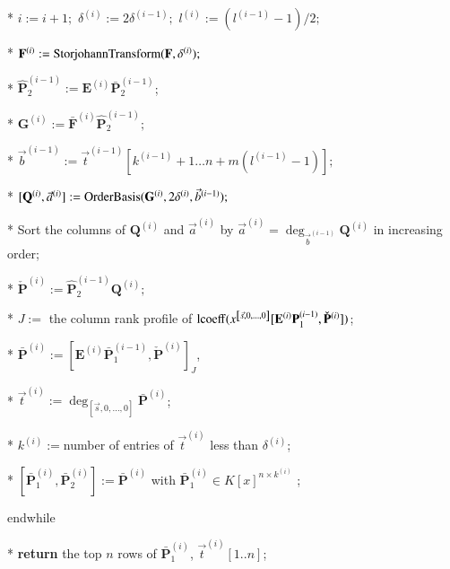 \begin{algorithm}[t]
\begin{algor}[1]
\item [{{{*}}}] $i:=i+1;$ $\delta^{\left(i\right)}:=2\delta^{\left(i-1\right)};$
$l^{\left(i\right)}:=(l^{\left(i-1\right)}-1)/2;$ 
\item [{{{*}}}] $\bar{\mathbf{F}}^{\left(i\right)}:=\StorjohannTransform(\mathbf{F},\delta^{\left(i\right)});$ 
\item [{{{*}}}] $\hat{\mathbf{P}}_{2}^{\left(i-1\right)}:=\mathbf{E}^{\left(i\right)}\bar{\mathbf{P}}_{2}^{\left(i-1\right)}$;
\item [{{{*}}}] \label{line:matrixProduct1}$\mathbf{G}^{\left(i\right)}:=\bar{\mathbf{F}}^{\left(i\right)}\hat{\mathbf{P}}_{2}^{\left(i-1\right)};$ 
\item [{{{*}}}] $\vec{b}^{\left(i-1\right)}:=\vec{t}^{\left(i-1\right)}[k^{\left(i-1\right)}+1\dots n+m(l^{\left(i-1\right)}-1)];$ 
\item [{{{*}}}] \label{line:orderBasisComputation}$[\mathbf{Q}^{\left(i\right)},\vec{a}^{\left(i\right)}]:=\mab(\mathbf{G}^{\left(i\right)},2\delta^{\left(i\right)},\vec{b}^{\left(i-1\right)});$ 
\item [{{{*}}}] Sort the columns of $\mathbf{Q}^{\left(i\right)}$ and
$\vec{a}^{\left(i\right)}$ by $\vec{a}^{\left(i\right)}=\deg_{\vec{b}^{\left(i-1\right)}}\mathbf{Q}^{\left(i\right)}$
in increasing order; 
\item [{{{*}}}] \label{line:matrixProduct2}$\check{\mathbf{P}}^{\left(i\right)}:=\hat{\mathbf{P}}_{2}^{\left(i-1\right)}\mathbf{Q}^{\left(i\right)};$ 
\item [{{{*}}}] \label{line:LSP}$J:=$ the column rank profile of $\operatorname{lcoeff}(x^{\left[\vec{s},0,\dots,0\right]}[\mathbf{E}^{\left(i\right)}\relax{\mathbf{P}}_{1}^{\left(i-1\right)},\check{\mathbf{P}}^{\left(i\right)}])$; 
\item [{{*}}] $\bar{\mathbf{P}}^{\left(i\right)}:=[\mathbf{E}^{\left(i\right)}\bar{\mathbf{P}}_{1}^{\left(i-1\right)},\check{\mathbf{P}}^{\left(i\right)}]_{J}$,
\item [{{*}}] $\vec{t}^{\left(i\right)}:=\deg_{\left[\vec{s},0,\dots,0\right]}\bar{\mathbf{P}}^{\left(i\right)}$; 
\item [{{{*}}}] $k^{\left(i\right)}:=$number of entries of $\vec{t}^{\left(i\right)}$
less than $\delta^{\left(i\right)}$;
\item [{{*}}] $[\bar{\mathbf{P}}_{1}^{\left(i\right)},\bar{\mathbf{P}}_{2}^{\left(i\right)}]:=\bar{\mathbf{P}}^{\left(i\right)}$
with $\bar{\mathbf{P}}_{1}^{\left(i\right)}\in K\left[x\right]^{n\times k^{\left(i\right)}}$
;
\item [{{endwhile}}] ~ 
\item [{{{*}}}] \textbf{return} the top $n$ rows of $\bar{\mathbf{P}}_{1}^{\left(i\right)}$,
$\vec{t}^{\left(i\right)}\left[1..n\right]$; 
\end{algor}

\end{algorithm}

